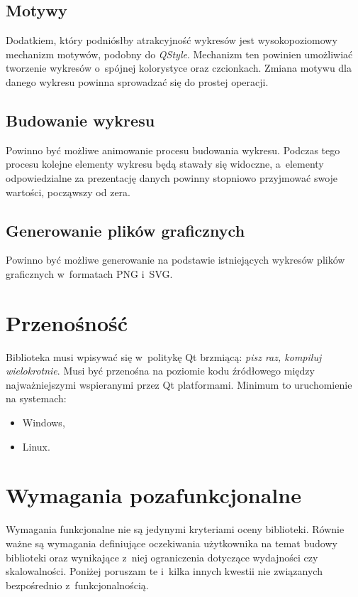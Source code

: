 \subsection{Motywy}
Dodatkiem, który podniósłby atrakcyjność wykresów jest wysokopoziomowy mechanizm motywów, podobny do \textit{QStyle}. Mechanizm ten powinien umożliwiać tworzenie wykresów o~spójnej kolorystyce oraz czcionkach. Zmiana motywu dla danego wykresu powinna sprowadzać się do prostej operacji.

\subsection{Budowanie wykresu}
Powinno być możliwe animowanie procesu budowania wykresu. Podczas tego procesu kolejne elementy wykresu będą stawały się widoczne, a~elementy odpowiedzialne za prezentację danych powinny stopniowo przyjmować swoje wartości, począwszy od zera.

\subsection{Generowanie plików graficznych}
Powinno być możliwe generowanie na podstawie istniejących wykresów plików graficznych  w~formatach PNG i~SVG.

\section{Przenośność}
Biblioteka musi wpisywać się w~politykę Qt brzmiącą: \textit{pisz raz, kompiluj wielokrotnie}. Musi być przenośna na poziomie kodu źródłowego między najważniejszymi wspieranymi przez Qt platformami.
Minimum to uruchomienie na systemach:
\begin{itemize}
\item{Windows,}
\item{Linux.}
\end{itemize}


\section{Wymagania pozafunkcjonalne}
Wymagania funkcjonalne nie są jedynymi kryteriami oceny biblioteki. Równie ważne są wymagania definiujące oczekiwania użytkownika na temat budowy biblioteki oraz wynikające z~niej ograniczenia dotyczące wydajności czy skalowalności. Poniżej poruszam te i~kilka innych kwestii nie związanych bezpośrednio z~funkcjonalnością.

